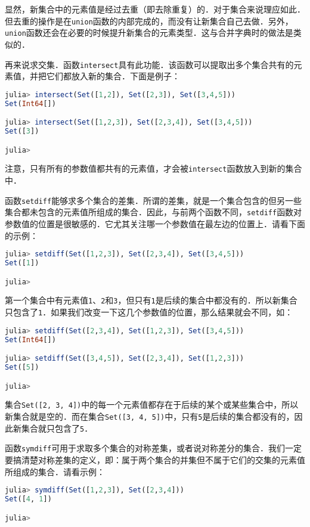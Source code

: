 显然，新集合中的元素值是经过去重（即去除重复）的．对于集合来说理应如此．但去重的操作是在\verb|union|函数的内部完成的，而没有让新集合自己去做．另外，\verb|union|函数还会在必要的时候提升新集合的元素类型．这与合并字典时的做法是类似的．

再来说求交集．函数\verb|intersect|具有此功能．该函数可以提取出多个集合共有的元素值，并把它们都放入新的集合．下面是例子：

\begin{lstlisting}[language=julia]
julia> intersect(Set([1,2]), Set([2,3]), Set([3,4,5]))
Set(Int64[])

julia> intersect(Set([1,2,3]), Set([2,3,4]), Set([3,4,5]))
Set([3])

julia> 
\end{lstlisting}

注意，只有所有的参数值都共有的元素值，才会被\verb|intersect|函数放入到新的集合中．

函数\verb|setdiff|能够求多个集合的差集．所谓的差集，就是一个集合包含的但另一些集合都未包含的元素值所组成的集合．因此，与前两个函数不同，\verb|setdiff|函数对参数值的位置是很敏感的．它尤其关注哪一个参数值在最左边的位置上．请看下面的示例：

\begin{lstlisting}[language=julia]
julia> setdiff(Set([1,2,3]), Set([2,3,4]), Set([3,4,5]))
Set([1])

julia> 
\end{lstlisting}

第一个集合中有元素值\verb|1|、\verb|2|和\verb|3|，但只有\verb|1|是后续的集合中都没有的．所以新集合只包含了\verb|1|．如果我们改变一下这几个参数值的位置，那么结果就会不同，如：

\begin{lstlisting}[language=julia]
julia> setdiff(Set([2,3,4]), Set([1,2,3]), Set([3,4,5]))
Set(Int64[])

julia> setdiff(Set([3,4,5]), Set([2,3,4]), Set([1,2,3]))
Set([5])

julia> 
\end{lstlisting}

集合\verb|Set([2, 3, 4])|中的每一个元素值都存在于后续的某个或某些集合中，所以新集合就是空的．而在集合\verb|Set([3, 4, 5])|中，只有\verb|5|是后续的集合都没有的，因此新集合就只包含了\verb|5|．

函数\verb|symdiff|可用于求取多个集合的对称差集，或者说对称差分的集合．我们一定要搞清楚对称差集的定义，即：属于两个集合的并集但不属于它们的交集的元素值所组成的集合．请看示例：

\begin{lstlisting}[language=julia]
julia> symdiff(Set([1,2,3]), Set([2,3,4]))
Set([4, 1])

julia> 
\end{lstlisting}

